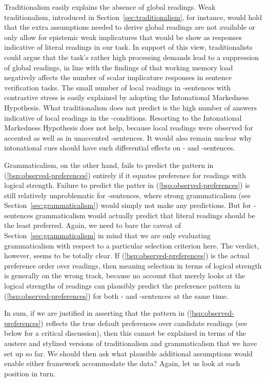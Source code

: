 \documentclass[fleqn,reqno,10pt,draft]{article}
\newcommand{\as}{\acro{as}}
\renewcommand{\es}{\acro{es}}
\begin{document}
Traditionalism easily explains the absence of global readings. Weak
traditionalism, introduced in Section~\ref{sec:traditionalism}, for
instance, would hold that the extra assumptions needed to derive
global readings are not available or only allow for epistemic weak
implicatures that would be show as responses indicative of literal
readings in our task. In support of this view, traditionalists could
argue that the task's rather high processing demands lead to a
suppression of global readings, in line with the findings of
\citet{NeysDe-NeysSchaeken2007:When-People-Are} that working memory
load negatively affects the number of scalar implicature responses in
sentence verification tasks. The small number of local readings in
\as-sentences with contrastive stress is easily explained by adopting
the Intonational Markedness Hypothesis. What traditionalism does not
predict is the high number of answers indicative of local readings in
the \es-conditions. Resorting to the Intonational Markedness
Hypothesis does not help, because local readings were observed for
accented as well as in unaccented \es-sentences. It would also remain
unclear why intonational cues should have such differential effects on
\as- and \es-sentences.

Grammaticalism, on the other hand, fails to predict the pattern in
(\ref{bsp:observed-preferences}) entirely if it equates preference for
readings with logical strength. Failure to predict the patter in
(\ref{bsp:observed-preferences}) is still relatively unproblematic for
\es-sentences, where strong grammaticalism (see
Section~\ref{sec:grammaticalism}) would simply not make any
predictions. But for \as-sentences grammaticalism would actually
predict that literal readings should be the least preferred. Again,
we need to bare the caveat of Section~\ref{sec:grammaticalism} in mind
that we are only evaluating grammaticalism with respect to a
particular selection criterion here. The verdict, however, seems to be
totally clear. If (\ref{bsp:observed-preferences}) is the actual
preference order over readings, then meaning selection in terms of
logical strength is generally on the wrong track, because no account
that merely looks at the logical strengths of readings can plausibly
predict the preference pattern in (\ref{bsp:observed-preferences}) for
both \as- and \es-sentences at the same time.

In sum, if we are justified in asserting that the pattern in
(\ref{bsp:observed-preferences}) reflects the true default preferences
over candidate readings (see below for a critical discussion), then
this cannot be explained in terms of the austere and stylized versions
of traditionalism and grammaticalism that we have set up so far. We
should then ask what plausible additional assumptions would enable
either framework accommodate the data? Again, let us look at each
position in turn.
\end{document}
